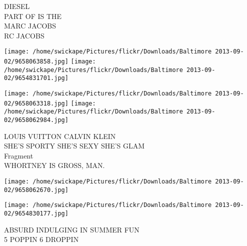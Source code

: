 \documentclass[10pt,letterpaper]{article}
\begin{document}
DIESEL\\
PART OF IS THE\\
MARC JACOBS\\
RC JACOBS
\pagebreak

\texttt{[image: /home/swickape/Pictures/flickr/Downloads/Baltimore 2013-09-02/9658063858.jpg]}
\texttt{[image: /home/swickape/Pictures/flickr/Downloads/Baltimore 2013-09-02/9654831701.jpg]}

\texttt{[image: /home/swickape/Pictures/flickr/Downloads/Baltimore 2013-09-02/9658063318.jpg]}
\texttt{[image: /home/swickape/Pictures/flickr/Downloads/Baltimore 2013-09-02/9658062984.jpg]}

LOUIS VUITTON CALVIN KLEIN\\
SHE'S SPORTY SHE'S SEXY SHE'S GLAM\\
Fragment\\
WHORTNEY IS GROSS, MAN.
\pagebreak

\texttt{[image: /home/swickape/Pictures/flickr/Downloads/Baltimore 2013-09-02/9658062670.jpg]}

\vspace{0.25in}
\texttt{[image: /home/swickape/Pictures/flickr/Downloads/Baltimore 2013-09-02/9654830177.jpg]}

ABSURD INDULGING IN SUMMER FUN\\
5 POPPIN 6 DROPPIN
\pagebreak
\end{document}
